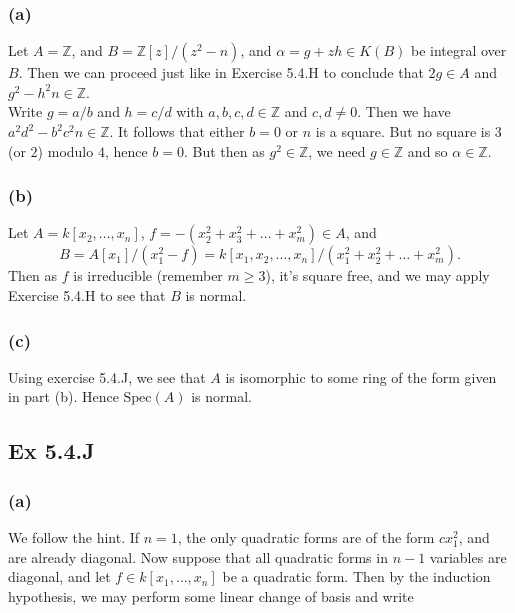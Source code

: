 \documentclass{article}
\theoremstyle{definition}
\newcommand{\Z}{\mathbb{Z}}
\newcommand{\Spec}{\text{Spec}}
\begin{document}
\subsubsection*{(a)}

Let $A = \Z$, and $B = \Z[z]/(z^2 - n)$, and $\alpha = g + z h \in K(B)$
be integral over $B$. Then we can proceed just like in Exercise 5.4.H
to conclude that $2g \in A$ and $g^2 - h^2 n \in \Z$. \\

Write $g = a/b$ and $h = c/d$ with $a,b,c,d \in \Z$ and $c, d \not = 0$. Then
we have $a^2d^2 - b^2c^2 n \in \Z$. It follows that either $b = 0$ or $n$ is a
square. But no square is $3$ (or $2$) modulo $4$, hence $b = 0$. But then as
$g^2 \in \Z$, we need $g \in \Z$ and so $\alpha \in \Z$.

\subsubsection*{(b)}

Let $A = k[x_2, \ldots, x_n]$, $f = -(x_2^2 + x_3^2 + \ldots + x_m^2) \in A$,
and
\[
	B
	=
	A[x_1]/(x_1^2 - f)
	=
	k[x_1, x_2, \ldots, x_n]/(x_1^2 + x_2^2 + \ldots + x_m^2).
\]
Then as $f$ is irreducible (remember $m \geq 3$), it's square free, and we may
apply Exercise 5.4.H to see that $B$ is normal.

\subsubsection*{(c)}

Using exercise 5.4.J, we see that $A$ is isomorphic to some ring of the form
given in part (b). Hence $\Spec(A)$ is normal.

\subsection*{Ex 5.4.J}

\subsubsection*{(a)}

We follow the hint. If $n = 1$, the only quadratic forms are of the form $c
	x_1^2$, and are already diagonal. Now suppose that all quadratic forms in $n -
	1$ variables are diagonal, and let $f \in k[x_1, \ldots, x_n]$ be a quadratic
form. Then by the induction hypothesis, we may perform some linear change of
basis and write
\end{document}

